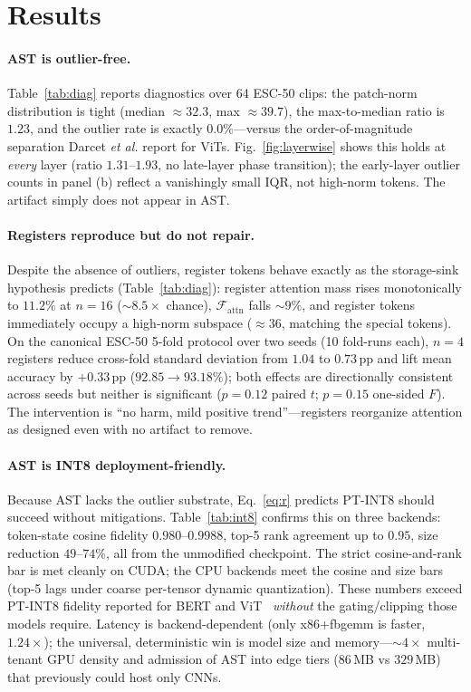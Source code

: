 \documentclass{article}
\begin{document}
\section{Results}
\paragraph{AST is outlier-free.} Table~\ref{tab:diag} reports diagnostics over 64 ESC-50 clips: the patch-norm distribution is tight (median $\approx 32.3$, max $\approx 39.7$), the max-to-median ratio is $1.23$, and the outlier rate is exactly $0.0\%$---versus the order-of-magnitude separation Darcet \emph{et al.} report for ViTs. Fig.~\ref{fig:layerwise} shows this holds at \emph{every} layer (ratio $1.31$--$1.93$, no late-layer phase transition); the early-layer outlier counts in panel (b) reflect a vanishingly small IQR, not high-norm tokens. The artifact simply does not appear in AST.

\paragraph{Registers reproduce but do not repair.} Despite the absence of outliers, register tokens behave exactly as the storage-sink hypothesis predicts (Table~\ref{tab:diag}): register attention mass rises monotonically to $11.2\%$ at $n{=}16$ ($\sim\!8.5\times$ chance), $\mathcal{F}_{\text{attn}}$ falls $\sim\!9\%$, and register tokens immediately occupy a high-norm subspace ($\approx 36$, matching the special tokens). On the canonical ESC-50 5-fold protocol over two seeds (10 fold-runs each), $n{=}4$ registers reduce cross-fold standard deviation from $1.04$ to $0.73$\,pp and lift mean accuracy by $+0.33$\,pp ($92.85\!\to\!93.18\%$); both effects are directionally consistent across seeds but neither is significant ($p{=}0.12$ paired $t$; $p{=}0.15$ one-sided $F$). The intervention is ``no harm, mild positive trend''---registers reorganize attention as designed even with no artifact to remove.

\paragraph{AST is INT8 deployment-friendly.} Because AST lacks the outlier substrate, Eq.~\eqref{eq:r} predicts PT-INT8 should succeed without mitigations. Table~\ref{tab:int8} confirms this on three backends: token-state cosine fidelity $0.980$--$0.9988$, top-5 rank agreement up to $0.95$, size reduction $49$--$74\%$, all from the unmodified checkpoint. The strict cosine-and-rank bar is met cleanly on CUDA; the CPU backends meet the cosine and size bars (top-5 lags under coarse per-tensor dynamic quantization). These numbers exceed PT-INT8 fidelity reported for BERT and ViT~\cite{bondarenko2023quantizable} \emph{without} the gating/clipping those models require. Latency is backend-dependent (only x86+fbgemm is faster, $1.24\times$); the universal, deterministic win is model size and memory---$\sim\!4\times$ multi-tenant GPU density and admission of AST into edge tiers ($86$\,MB vs $329$\,MB) that previously could host only CNNs.
\end{document}
